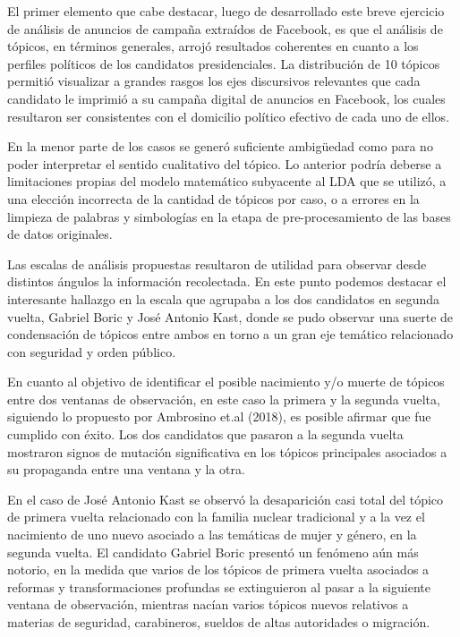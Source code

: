 \documentclass[
  10pt,
  letterpaper,
]{report}
\begin{document}
El primer elemento que cabe destacar, luego de desarrollado este breve
ejercicio de análisis de anuncios de campaña extraídos de Facebook, es
que el análisis de tópicos, en términos generales, arrojó resultados
coherentes en cuanto a los perfiles políticos de los candidatos
presidenciales. La distribución de 10 tópicos permitió visualizar a
grandes rasgos los ejes discursivos relevantes que cada candidato le
imprimió a su campaña digital de anuncios en Facebook, los cuales
resultaron ser consistentes con el domicilio político efectivo de cada
uno de ellos.

En la menor parte de los casos se generó suficiente ambigüedad como para
no poder interpretar el sentido cualitativo del tópico. Lo anterior
podría deberse a limitaciones propias del modelo matemático subyacente
al LDA que se utilizó, a una elección incorrecta de la cantidad de
tópicos por caso, o a errores en la limpieza de palabras y simbologías
en la etapa de pre-procesamiento de las bases de datos originales.

Las escalas de análisis propuestas resultaron de utilidad para observar
desde distintos ángulos la información recolectada. En este punto
podemos destacar el interesante hallazgo en la escala que agrupaba a los
dos candidatos en segunda vuelta, Gabriel Boric y José Antonio Kast,
donde se pudo observar una suerte de condensación de tópicos entre ambos
en torno a un gran eje temático relacionado con seguridad y orden
público.

En cuanto al objetivo de identificar el posible nacimiento y/o muerte de
tópicos entre dos ventanas de observación, en este caso la primera y la
segunda vuelta, siguiendo lo propuesto por Ambrosino et.al (2018), es
posible afirmar que fue cumplido con éxito. Los dos candidatos que
pasaron a la segunda vuelta mostraron signos de mutación significativa
en los tópicos principales asociados a su propaganda entre una ventana y
la otra.

En el caso de José Antonio Kast se observó la desaparición casi total
del tópico de primera vuelta relacionado con la familia nuclear
tradicional y a la vez el nacimiento de uno nuevo asociado a las
temáticas de mujer y género, en la segunda vuelta. El candidato Gabriel
Boric presentó un fenómeno aún más notorio, en la medida que varios de
los tópicos de primera vuelta asociados a reformas y transformaciones
profundas se extinguieron al pasar a la siguiente ventana de
observación, mientras nacían varios tópicos nuevos relativos a materias
de seguridad, carabineros, sueldos de altas autoridades o migración.
\end{document}
